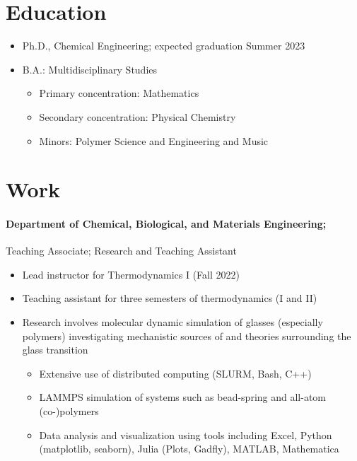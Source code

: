 \documentclass{my_cv}
\begin{document}

\section{Education}
\begin{itemize}
    \item Ph.D., Chemical Engineering; expected graduation Summer 2023
\end{itemize}
\begin{itemize}
    \item B.A.: Multidisciplinary Studies
    \begin{itemize}
        \item Primary concentration: Mathematics
        \item Secondary concentration: Physical Chemistry
    \item Minors: Polymer Science and Engineering and Music
    \end{itemize}
\end{itemize}

\section{Work}
\paragraph{Department of Chemical, Biological, and Materials Engineering;\\}
Teaching Associate; Research and Teaching Assistant
\begin{itemize}
    \item Lead instructor for Thermodynamics I (Fall 2022)
    \item Teaching assistant for three semesters of thermodynamics (I and II)
    \item Research involves molecular dynamic simulation of glasses (especially polymers) investigating mechanistic sources of and theories surrounding the glass transition
    \begin{itemize}
        \item Extensive use of distributed computing (SLURM, Bash, C++)
        \item LAMMPS simulation of systems such as bead-spring and all-atom (co-)polymers
        \item Data analysis and visualization using tools including Excel, Python (matplotlib, seaborn), Julia (Plots, Gadfly), MATLAB, Mathematica
    \end{itemize}
\end{itemize}
\end{document}
